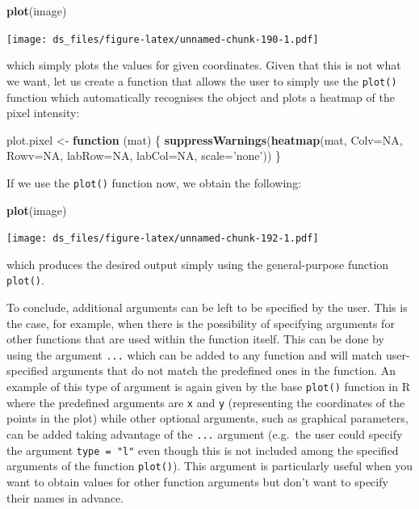 \documentclass[12pt,]{krantz}
\newenvironment{Shaded}{\begin{snugshade}}{\end{snugshade}}
\newcommand{\KeywordTok}[1]{\textcolor[rgb]{0.27,0.27,0.27}{\textbf{#1}}}
\newcommand{\DataTypeTok}[1]{\textcolor[rgb]{0.27,0.27,0.27}{#1}}
\newcommand{\StringTok}[1]{\textcolor[rgb]{0.5,0.5,0.5}{#1}}
\newcommand{\OtherTok}[1]{\textcolor[rgb]{0.37,0.37,0.37}{#1}}
\newcommand{\ControlFlowTok}[1]{\textcolor[rgb]{0.27,0.27,0.27}{\textbf{#1}}}
\newcommand{\NormalTok}[1]{#1}
\begin{document}
\begin{Shaded}
\begin{Highlighting}[]
\KeywordTok{plot}\NormalTok{(image)}
\end{Highlighting}
\end{Shaded}

\texttt{[image: ds\_files/figure-latex/unnamed-chunk-190-1.pdf]}

which simply plots the values for given coordinates. Given that this is
not what we want, let us create a function that allows the user to
simply use the \texttt{plot()} function which automatically recognises
the object and plots a heatmap of the pixel intensity:

\begin{Shaded}
\begin{Highlighting}[]
\NormalTok{plot.pixel <-}\StringTok{ }\ControlFlowTok{function}\NormalTok{ (mat) \{}
  \KeywordTok{suppressWarnings}\NormalTok{(}\KeywordTok{heatmap}\NormalTok{(mat, }\DataTypeTok{Colv=}\OtherTok{NA}\NormalTok{, }\DataTypeTok{Rowv=}\OtherTok{NA}\NormalTok{, }\DataTypeTok{labRow=}\OtherTok{NA}\NormalTok{, }\DataTypeTok{labCol=}\OtherTok{NA}\NormalTok{, }\DataTypeTok{scale=}\StringTok{'none'}\NormalTok{))}
\NormalTok{\}}
\end{Highlighting}
\end{Shaded}

If we use the \texttt{plot()} function now, we obtain the following:

\begin{Shaded}
\begin{Highlighting}[]
\KeywordTok{plot}\NormalTok{(image)}
\end{Highlighting}
\end{Shaded}

\texttt{[image: ds\_files/figure-latex/unnamed-chunk-192-1.pdf]}

which produces the desired output simply using the general-purpose
function \texttt{plot()}.

To conclude, additional arguments can be left to be specified by the
user. This is the case, for example, when there is the possibility of
specifying arguments for other functions that are used within the
function itself. This can be done by using the argument \texttt{...}
which can be added to any function and will match user-specified
arguments that do not match the predefined ones in the function. An
example of this type of argument is again given by the base
\texttt{plot()} function in R where the predefined arguments are
\texttt{x} and \texttt{y} (representing the coordinates of the points in
the plot) while other optional arguments, such as graphical parameters,
can be added taking advantage of the \texttt{...} argument (e.g.~the
user could specify the argument \texttt{type\ =\ "l"} even though this
is not included among the specified arguments of the function
\texttt{plot()}). This argument is particularly useful when you want to
obtain values for other function arguments but don't want to specify
their names in advance.
\end{document}

